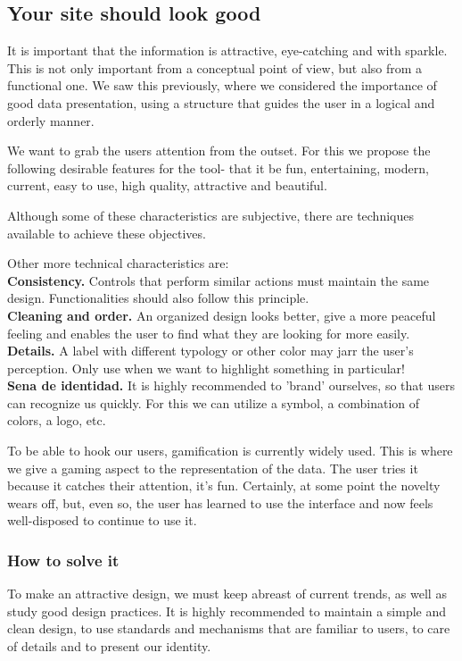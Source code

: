\subsection{Your site should look good}
It is important that the information is attractive, eye-catching and with sparkle. This is not only important from a conceptual point of view, but also from a functional one. We saw this previously, where we considered the importance
of good data presentation, using a structure that guides the user in a logical and orderly manner.

We want to grab the users attention from the outset. For this we propose the following desirable features for the tool- that it be fun, entertaining,
modern, current, easy to use, high quality, attractive and beautiful.

Although some of these characteristics are subjective, there are techniques available to achieve these objectives.

Other more technical characteristics are: \\

\textbf{Consistency.} Controls that perform similar actions must maintain the same design. Functionalities
should also follow this principle. \\

\textbf{Cleaning and order.} An organized design looks better, give a more peaceful feeling and enables the user to find what they are looking for
more easily.\\

\textbf{Details.} A label with different typology or other color may jarr the user's perception. Only use when
we want to highlight something in particular! \\

\textbf{Sena de identidad.} It is highly recommended to 'brand' ourselves, so that users can recognize us quickly. For this we can utilize a symbol, a combination of colors, a logo, etc.

To be able to hook our users, gamification is currently widely used. This is where we give a gaming aspect to the representation of the data. The user tries it because it catches their attention, it's fun.
Certainly, at some point the novelty wears off, but, even so, the user has learned to use the interface and now feels well-disposed to continue to use it.

\subsubsection*{How to solve it} 
To make an attractive design, we must keep abreast of current trends, as well as study good design practices.
It is highly recommended to maintain a simple and clean design, to use standards and mechanisms that are familiar to users,
to care of details and to present our identity.
